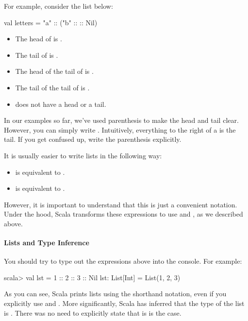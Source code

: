 \documentclass{book}
\begin{document}
For example, consider the list below:
\begin{scalacode}
val letters = "a" :: ("b" :: :: Nil)
\end{scalacode}
%
\begin{itemize}

  \item The head of  is .

  \item The tail of  is .

  \item The head of the tail of  is .

  \item The tail of the tail of  is .

  \item {} does not have a head or a tail.

\end{itemize}

In our examples so far, we've used parenthesis to make the head and tail clear.
However, you can simply write . Intuitively,
everything to the right of a \scalainline{::} is the tail. If you get confused
up, write the parenthesis explicitly.

It is usually easier to write lists in the following way:
%
\begin{itemize}

  \item {} is equivalent to
  .

  \item {} is equivalent to .

\end{itemize}
%
However, it is important to understand that this is just a convenient notation.
Under the hood, Scala transforms these expressions to use \scalainline{::}
and , as we described above.

\paragraph{Lists and Type Inference}

You should try to type out the expressions above into the \sbt{} console.
For example:
%
\begin{console}
scala> val lst = 1 :: 2 :: 3 :: Nil
lst: List[Int] = List(1, 2, 3)
\end{console}
%
As you can see, Scala prints lists using the shorthand notation,
even if you explicitly use \scalainline{::} and .
More significantly, Scala has inferred that the type of the list
is . There was no need to explicitly state that
is is the case.
\end{document}
